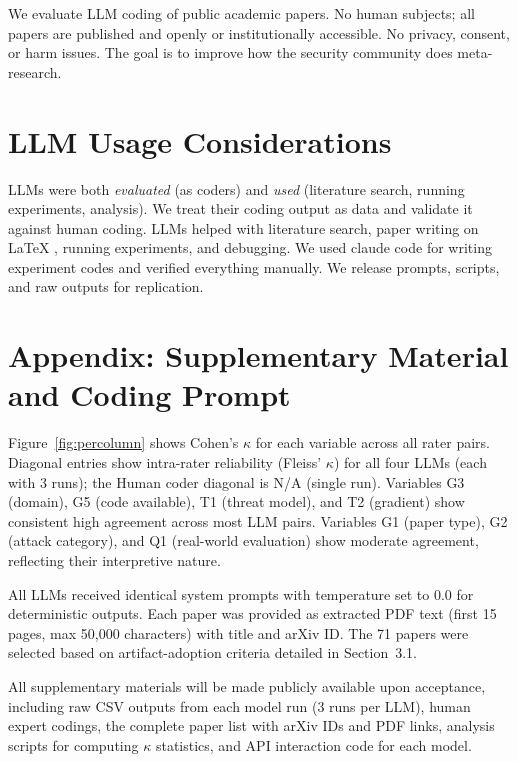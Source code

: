 \documentclass[conference,compsoc]{IEEEtran}
\begin{document}
We evaluate LLM coding of public academic papers. No human subjects; all papers are published and openly or institutionally accessible. No privacy, consent, or harm issues. The goal is to improve how the security community does meta-research.

\section{LLM Usage Considerations}

LLMs were both \emph{evaluated} (as coders) and \emph{used} (literature search, running experiments, analysis). We treat their coding output as data and validate it against human coding. LLMs helped with literature search, paper writing on LaTeX , running experiments, and debugging. We used claude code for writing experiment codes and verified everything manually. We release prompts, scripts, and raw outputs for replication.



\onecolumn
\appendix
\section*{Appendix: Supplementary Material and Coding Prompt}
\label{app:heatmaps}

\noindent Figure~\ref{fig:percolumn} shows Cohen's $\kappa$ for each variable across all rater pairs. Diagonal entries show intra-rater reliability (Fleiss' $\kappa$) for all four LLMs (each with 3 runs); the Human coder diagonal is N/A (single run). Variables G3 (domain), G5 (code available), T1 (threat model), and T2 (gradient) show consistent high agreement across most LLM pairs. Variables G1 (paper type), G2 (attack category), and Q1 (real-world evaluation) show moderate agreement, reflecting their interpretive nature.

All LLMs received identical system prompts with temperature set to 0.0 for deterministic outputs. Each paper was provided as extracted PDF text (first 15 pages, max 50,000 characters) with title and arXiv ID. The 71 papers were selected based on artifact-adoption criteria detailed in Section~3.1.

All supplementary materials will be made publicly available upon acceptance, including raw CSV outputs from each model run (3 runs per LLM), human expert codings, the complete paper list with arXiv IDs and PDF links, analysis scripts for computing $\kappa$ statistics, and API interaction code for each model.
\end{document}

